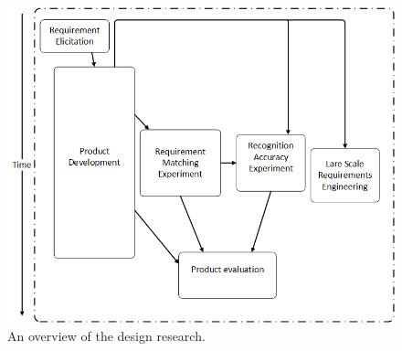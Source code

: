 

\begin{figure}[h]
\centering
\includegraphics[width = 400pt, keepaspectratio = true]{fig/methodsummarythesis.png}
\caption{An overview of the design research.}
\label{fig:resov}
\end{figure}
\FloatBarrier

